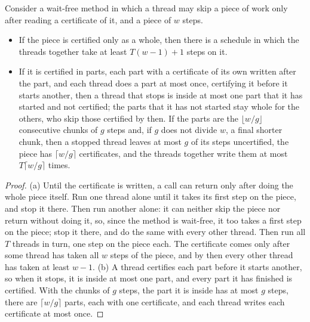\begin{proposition}
\label{prop:granularity}
Consider a wait-free method in which a thread may skip a piece of work only after reading a certificate of it, and a piece of $w$ steps.
\begin{itemize}
    \item[(a)] If the piece is certified only as a whole, then there is a schedule in which the threads together take at least $T(w-1) + 1$ steps on it.
    \item[(b)] If it is certified in parts, each part with a certificate of its own written after the part, and each thread does a part at most once, certifying it before it starts another, then a thread that stops is inside at most one part that it has started and not certified; the parts that it has not started stay whole for the others, who skip those certified by then. If the parts are the $\lfloor w/g \rfloor$ consecutive chunks of $g$ steps and, if $g$ does not divide $w$, a final shorter chunk, then a stopped thread leaves at most $g$ of its steps uncertified, the piece has $\lceil w/g \rceil$ certificates, and the threads together write them at most $T \lceil w/g \rceil$ times.
\end{itemize}
\end{proposition}
\begin{proof}
(a) Until the certificate is written, a call can return only after doing the whole piece itself. Run one thread alone until it takes its first step on the piece, and stop it there. Then run another alone: it can neither skip the piece nor return without doing it, so, since the method is wait-free, it too takes a first step on the piece; stop it there, and do the same with every other thread. Then run all $T$ threads in turn, one step on the piece each. The certificate comes only after some thread has taken all $w$ steps of the piece, and by then every other thread has taken at least $w-1$. (b) A thread certifies each part before it starts another, so when it stops, it is inside at most one part, and every part it has finished is certified. With the chunks of $g$ steps, the part it is inside has at most $g$ steps, there are $\lceil w/g \rceil$ parts, each with one certificate, and each thread writes each certificate at most once.
\end{proof}

